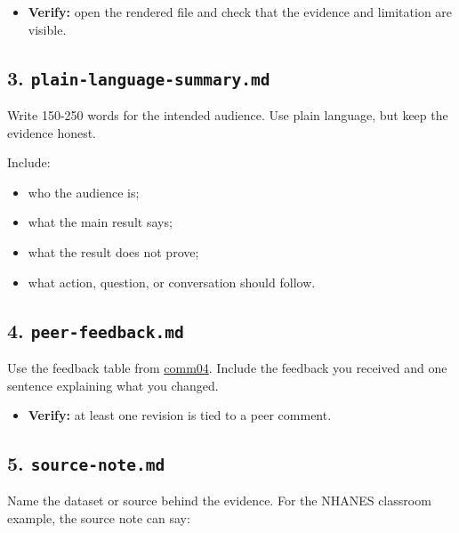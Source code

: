 \documentclass[
  letterpaper,
  DIV=11,
  numbers=noendperiod,
  oneside]{scrreprt}
\providecommand{\tightlist}{%
  \setlength{\itemsep}{0pt}\setlength{\parskip}{0pt}}
\begin{document}
\begin{itemize}
\tightlist
\item
  \textbf{Verify:} open the rendered file and check that the evidence
  and limitation are visible.
\end{itemize}

\subsection*{\texorpdfstring{3.
\texttt{plain-language-summary.md}}{3. plain-language-summary.md}}\label{plain-language-summary.md}

Write 150-250 words for the intended audience. Use plain language, but
keep the evidence honest.

Include:

\begin{itemize}
\tightlist
\item
  who the audience is;
\item
  what the main result says;
\item
  what the result does not prove;
\item
  what action, question, or conversation should follow.
\end{itemize}

\subsection*{\texorpdfstring{4.
\texttt{peer-feedback.md}}{4. peer-feedback.md}}\label{peer-feedback.md}

Use the feedback table from \hyperref[peer-feedback]{comm04}. Include
the feedback you received and one sentence explaining what you changed.

\begin{itemize}
\tightlist
\item
  \textbf{Verify:} at least one revision is tied to a peer comment.
\end{itemize}

\subsection*{\texorpdfstring{5.
\texttt{source-note.md}}{5. source-note.md}}\label{source-note.md}

Name the dataset or source behind the evidence. For the NHANES classroom
example, the source note can say:
\end{document}
